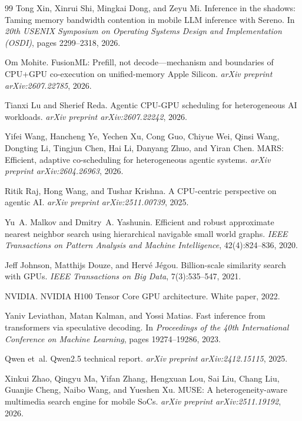 \documentclass{article}
\begin{document}
{\begin{thebibliography}{99}
Tong Xin, Xinrui Shi, Mingkai Dong, and Zeyu Mi.
\newblock Inference in the shadows: Taming memory bandwidth contention in mobile LLM inference with Sereno.
\newblock In \emph{20th USENIX Symposium on Operating Systems Design and Implementation (OSDI)}, pages 2299--2318, 2026.

Om Mohite.
\newblock FusionML: Prefill, not decode---mechanism and boundaries of CPU+GPU co-execution on unified-memory Apple Silicon.
\newblock \emph{arXiv preprint arXiv:2607.22785}, 2026.

Tianxi Lu and Sherief Reda.
\newblock Agentic CPU-GPU scheduling for heterogeneous AI workloads.
\newblock \emph{arXiv preprint arXiv:2607.22242}, 2026.

Yifei Wang, Hancheng Ye, Yechen Xu, Cong Guo, Chiyue Wei, Qinsi Wang, Dongting Li, Tingjun Chen, Hai Li, Danyang Zhuo, and Yiran Chen.
\newblock MARS: Efficient, adaptive co-scheduling for heterogeneous agentic systems.
\newblock \emph{arXiv preprint arXiv:2604.26963}, 2026.

Ritik Raj, Hong Wang, and Tushar Krishna.
\newblock A CPU-centric perspective on agentic AI.
\newblock \emph{arXiv preprint arXiv:2511.00739}, 2025.

Yu~A. Malkov and Dmitry~A. Yashunin.
\newblock Efficient and robust approximate nearest neighbor search using hierarchical navigable small world graphs.
\newblock \emph{IEEE Transactions on Pattern Analysis and Machine Intelligence}, 42(4):824--836, 2020.

Jeff Johnson, Matthijs Douze, and Herv{\'e} J{\'e}gou.
\newblock Billion-scale similarity search with GPUs.
\newblock \emph{IEEE Transactions on Big Data}, 7(3):535--547, 2021.

NVIDIA.
\newblock NVIDIA H100 Tensor Core GPU architecture.
\newblock White paper, 2022.

Yaniv Leviathan, Matan Kalman, and Yossi Matias.
\newblock Fast inference from transformers via speculative decoding.
\newblock In \emph{Proceedings of the 40th International Conference on Machine Learning}, pages 19274--19286, 2023.

Qwen et~al.
\newblock Qwen2.5 technical report.
\newblock \emph{arXiv preprint arXiv:2412.15115}, 2025.

Xinkui Zhao, Qingyu Ma, Yifan Zhang, Hengxuan Lou, Sai Liu, Chang Liu, Guanjie Cheng, Naibo Wang, and Yueshen Xu.
\newblock MUSE: A heterogeneity-aware multimedia search engine for mobile SoCs.
\newblock \emph{arXiv preprint arXiv:2511.19192}, 2026.

\end{thebibliography}
}
\end{document}
